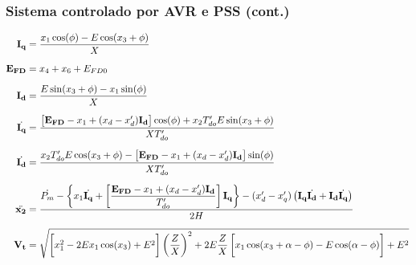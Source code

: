 \documentclass[10pt, compress,xcolor={svgnames,dvipsnames,x11names}]{beamer}
\begin{document}
\begin{frame}%
\frametitle{Sistema controlado por AVR e PSS (cont.)}
\scriptsize

\begin{align} 
\mathbf{I_q} &= \frac{x_1\cos(\phi) - E\cos(x_3 + \phi) }{X}  \\[2mm]
%
\mathbf{E_{FD}} &= x_4 + x_6 + E_{FD0}\\[2mm]
%
\mathbf{I_d} &=  \frac{E\sin(x_3 + \phi) - x_1\sin(\phi) }{X} \\[2mm]
%
\dot{\mathbf{I_q}} &= \frac{\left[\strut \mathbf{E_{FD}} - x_1 + (x_d - x'_d)\mathbf{I_d}\right]\cos(\phi) + x_2T'_{do}E\sin(x_3 + \phi)}{XT'_{do}}\\[2mm]
%
\dot{\mathbf{I_d}} &= \frac{x_2T'_{do}E\cos(x_3 + \phi) - \left[\strut \mathbf{E_{FD}} - x_1 + (x_d - x'_d)\mathbf{I_d}\right]\sin(\phi)}{XT'_{do}}\\[2mm]
%
\ddot{\mathbf{x_2}} &= \dfrac{\dot{P_m} - \left\{\strut x_1\dot{\mathbf{I_q}} + \left[\strut \dfrac{\mathbf{E_{FD}} - x_1 + (x_d - x'_d)\mathbf{I_d}}{T'_{do}} \right] \mathbf{I_q} \right\} - (x'_d - x'_q) \left( \mathbf{I_q} \dot{\mathbf{I_d}} + \mathbf{I_d} \dot{\mathbf{I_q}} \right)}{2H}\\[2mm]
%
\mathbf{V_t} &= \sqrt{\left[\strut  x_1^2 - 2Ex_1\cos(x_3) + E^2 \vphantom{\int} \right] \left( \frac{Z}{X} \right)^2 + 2E\frac{Z}{X}\left[\strut \vphantom{\int} x_1\cos(x_3 + \alpha - \phi) - E\cos(\alpha - \phi) \vphantom{\int}\right] + E^2 }
\end{align}

\normalsize
\end{frame}%
\end{document}
